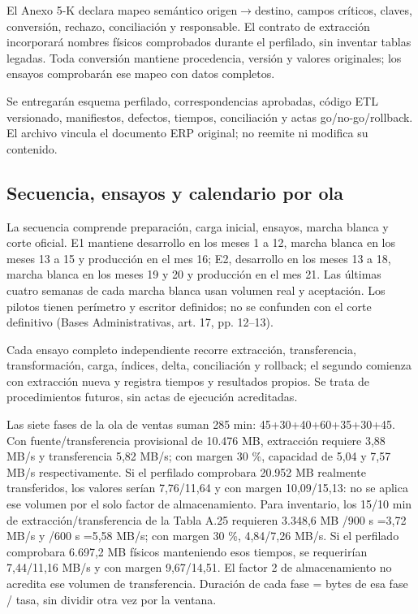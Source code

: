 El Anexo 5-K declara mapeo semántico origen\ensuremath{\rightarrow}destino, campos críticos, claves, conversión, rechazo, conciliación y responsable. El contrato de extracción incorporará nombres físicos comprobados durante el perfilado, sin inventar tablas legadas. Toda conversión mantiene procedencia, versión y valores originales; los ensayos comprobarán ese mapeo con datos completos.

Se entregarán esquema perfilado, correspondencias aprobadas, código ETL versionado, manifiestos, defectos, tiempos, conciliación y actas go/no-go/rollback. El archivo vincula el documento ERP original; no reemite ni modifica su contenido.

\subsection{Secuencia, ensayos y calendario por ola}
\label{sec:sd5-5-3-4}

La secuencia comprende preparación, carga inicial, ensayos, marcha blanca y corte oficial. E1 mantiene desarrollo en los meses 1 a 12, marcha blanca en los meses 13 a 15 y producción en el mes 16; E2, desarrollo en los meses 13 a 18, marcha blanca en los meses 19 y 20 y producción en el mes 21. Las últimas cuatro semanas de cada marcha blanca usan volumen real y aceptación. Los pilotos tienen perímetro y escritor definidos; no se confunden con el corte definitivo (Bases Administrativas, art. 17, pp. 12–13).

Cada ensayo completo independiente recorre extracción, transferencia, transformación, carga, índices, delta, conciliación y rollback; el segundo comienza con extracción nueva y registra tiempos y resultados propios. Se trata de procedimientos futuros, sin actas de ejecución acreditadas.

Las siete fases de la ola de ventas suman 285 min: 45+30+40+60+35+30+45. Con fuente/transferencia provisional de 10.476 MB, extracción requiere 3,88 MB/s y transferencia 5,82 MB/s; con margen 30 \%, capacidad de 5,04 y 7,57 MB/s respectivamente. Si el perfilado comprobara 20.952 MB realmente transferidos, los valores serían 7,76/11,64 y con margen 10,09/15,13: no se aplica ese volumen por el solo factor de almacenamiento. Para inventario, los 15/10 min de extracción/transferencia de la Tabla A.25 requieren 3.348,6 MB /900 s =3,72 MB/s y /600 s =5,58 MB/s; con margen 30 \%, 4,84/7,26 MB/s. Si el perfilado comprobara 6.697,2 MB físicos manteniendo esos tiempos, se requerirían 7,44/11,16 MB/s y con margen 9,67/14,51. El factor 2 de almacenamiento no acredita ese volumen de transferencia. Duración de cada fase = bytes de esa fase / tasa, sin dividir otra vez por la ventana.


